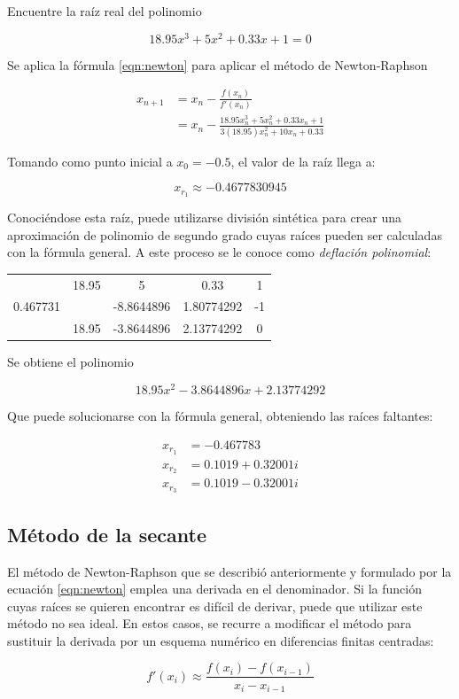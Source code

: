 \begin{ex}
	Encuentre la raíz real del polinomio 

	\[
		18.95x^3 + 5x^2  + 0.33x + 1 = 0
	\]

	\begin{solution}
		Se aplica la fórmula \ref{eqn:newton} para aplicar el método de
		Newton-Raphson

		\begin{align*}
			x_{n+1} &= x_n - \frac{f(x_n)}{f'(x_n)} \\
				&= x_n - \frac{18.95x_n^3 + 5x_n^2 + 0.33x_n +
				1}{3(18.95)x_n^2 + 10x_n + 0.33}
		\end{align*}

		Tomando como punto inicial a \(x_0 = -0.5 \), el valor de la raíz
		llega a:

		\[
			\boxed{x_{r_1} \approx -0.4677830945}
		\]

		Conociéndose esta raíz, puede utilizarse división sintética para
		crear una aproximación de polinomio de segundo grado cuyas
		raíces pueden ser calculadas con la fórmula general. A este
		proceso se le conoce como \textit{deflación polinomial}:

		\begin{center}
			\begin{tabular}{ c | c c c c }
				& 18.95 & 5 & 0.33 & 1 \\
			        0.467731 & & -8.8644896 & 1.80774292 & -1 \\
			 \hline
				 & 18.95 & -3.8644896 & 2.13774292 & 0
			\end{tabular}
		\end{center}

		Se obtiene el polinomio 

		\[
			18.95x^2 - 3.8644896x + 2.13774292
		\]

		Que puede solucionarse con la fórmula general, obteniendo las
		raíces faltantes:

		\begin{align*}
			x_{r_1} &= -0.467783 \\
			x_{r_2} &= 0.1019 + 0.32001 i \\
			x_{r_3} &= 0.1019 - 0.32001 i 
		\end{align*}
	\end{solution}

\end{ex}

\subsection{Método de la secante}

El método de Newton-Raphson que se describió anteriormente y formulado por la
ecuación \ref{eqn:newton} emplea una derivada en el denominador. Si la función
cuyas raíces se quieren encontrar es difícil de derivar, puede que utilizar este
método no sea ideal. En estos casos, se recurre a modificar el método para
sustituir la derivada por un esquema numérico en diferencias finitas centradas:

\[
	f'(x_i) \approx \frac{f(x_i) - f(x_{i-1})}{x_i - x_{i-1}}
\]
